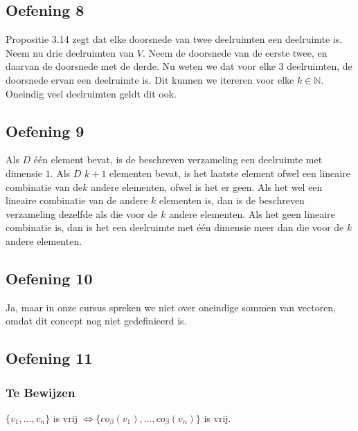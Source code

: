\documentclass[lineaire_algebra_oplossingen.tex]{subfiles}
\begin{document}
\subsection{Oefening 8}
Propositie 3.14 zegt dat elke doorsnede van twee deelruimten een deelruimte is. Neem nu drie deelruimten van $V$. Neem de doorsnede van de eerste twee, en daarvan de doorsnede met de derde. Nu weten we dat voor elke $3$ deelruimten, de doorsnede ervan een deelruimte is. Dit kunnen we itereren voor elke $k \in \mathbb{N}$. Oneindig veel deelruimten geldt dit ook.

\subsection{Oefening 9}
Als $D$ \'e\'en element bevat, is de beschreven verzameling een deelruimte met dimensie $1$. Als $D$ $k+1$ elementen bevat, is het laatste element ofwel een lineaire combinatie van de$k$ andere elementen, ofwel is het er geen. Als het wel een lineaire combinatie van de andere $k$ elementen is, dan is de beschreven verzameling dezelfde als die voor de $k$ andere elementen. Als het geen lineaire combinatie is, dan is het een deelruimte met \'e\'en dimensie meer dan die voor de $k$ andere elementen.

\subsection{Oefening 10}
Ja, maar in onze cursus spreken we niet over oneindige sommen van vectoren, omdat dit concept nog niet gedefinieerd is.


\subsection{Oefening 11}
\subsubsection*{Te Bewijzen}
$\{v_1,...,v_n\}$ is vrij $\Leftrightarrow \{co_{\beta}(v_1),...,co_{\beta}(v_n)\}$ is vrij.
\end{document}
